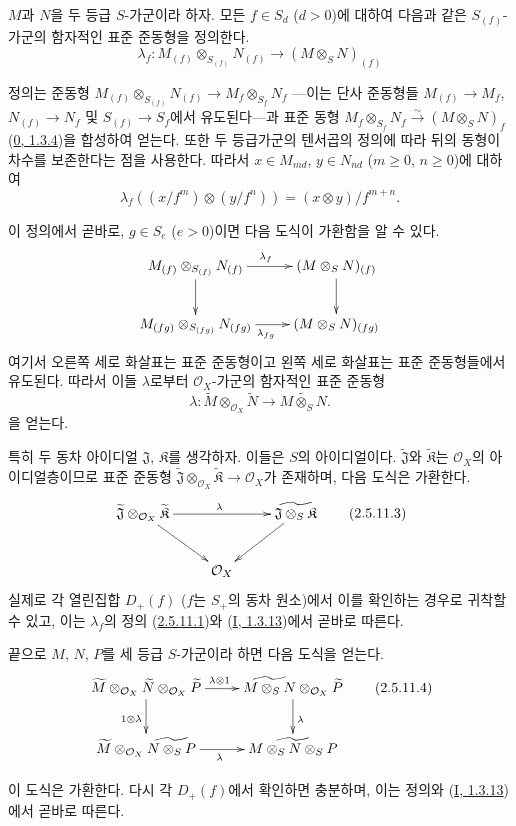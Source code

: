 \begin{env}[2.5.11]
\label{II.2.5.11-ko}
$M$과 $N$을 두 등급 $S$-가군이라 하자. 모든 $f\in S_d$ ($d>0$)에
대하여 다음과 같은 $S_{(f)}$-가군의 함자적인 표준 준동형을 정의한다.
\[
\label{II.2.5.11.1-ko}
  \lambda_f:M_{(f)}\otimes_{S_{(f)}}N_{(f)}
  \longrightarrow(M\otimes_S N)_{(f)}
\tag{2.5.11.1}
\]

정의는 준동형
$M_{(f)}\otimes_{S_{(f)}}N_{(f)}\to M_f\otimes_{S_f}N_f$
---이는 단사 준동형들 $M_{(f)}\to M_f$, $N_{(f)}\to N_f$ 및
$S_{(f)}\to S_f$에서 유도된다---과 표준 동형
$M_f\otimes_{S_f}N_f\xrightarrow{\sim}(M\otimes_S N)_f$
(\hyperref[0.1.3.4-ko]{0, 1.3.4})을 합성하여 얻는다. 또한 두 등급가군의
텐서곱의 정의에 따라 뒤의 동형이 차수를 보존한다는 점을 사용한다. 따라서
$x\in M_{md}$, $y\in N_{nd}$ ($m\geq0$, $n\geq0$)에 대하여
\[
  \lambda_f((x/f^m)\otimes(y/f^n))=(x\otimes y)/f^{m+n}.
\]

이 정의에서 곧바로, $g\in S_e$ ($e>0$)이면 다음 도식이 가환함을 알 수
있다.
\[
  \xymatrix{
    M_{(f)}\otimes_{S_{(f)}}N_{(f)}\ar[r]^{\lambda_f}\ar[d]
    & (M\otimes_S N)_{(f)}\ar[d]\\
    M_{(fg)}\otimes_{S_{(fg)}}N_{(fg)}\ar[r]_{\lambda_{fg}}
    & (M\otimes_S N)_{(fg)}
  }
\]
여기서 오른쪽 세로 화살표는 표준 준동형이고 왼쪽 세로 화살표는 표준
준동형들에서 유도된다. 따라서 이들 $\lambda$로부터
$\mathcal{O}_X$-가군의 함자적인 표준 준동형
\[
\label{II.2.5.11.2-ko}
  \lambda:\widetilde{M}\otimes_{\mathcal{O}_X}\widetilde{N}
  \longrightarrow\widetilde{M\otimes_S N}.
\tag{2.5.11.2}
\]
을 얻는다.

특히 두 동차 아이디얼 $\mathfrak{J}$, $\mathfrak{K}$를 생각하자. 이들은
$S$의 아이디얼이다. $\widetilde{\mathfrak{J}}$와
$\widetilde{\mathfrak{K}}$는 $\mathcal{O}_X$의 아이디얼층이므로 표준 준동형
$\widetilde{\mathfrak{J}}\otimes_{\mathcal{O}_X}
\widetilde{\mathfrak{K}}\to\mathcal{O}_X$가 존재하며, 다음 도식은 가환한다.
\[
\label{II.2.5.11.3-ko}
  \xymatrix{
    \widetilde{\mathfrak{J}}\otimes_{\mathcal{O}_X}
    \widetilde{\mathfrak{K}}\ar[rr]^\lambda\ar[dr]
    && \widetilde{\mathfrak{J}\otimes_S\mathfrak{K}}\ar[dl]\\
    & \mathcal{O}_X &
  }
\tag{2.5.11.3}
\]
실제로 각 열린집합 $D_+(f)$ ($f$는 $S_+$의 동차 원소)에서 이를 확인하는
경우로 귀착할 수 있고, 이는 $\lambda_f$의 정의
(\hyperref[II.2.5.11.1-ko]{2.5.11.1})와
(\hyperref[I.1.3.13-ko]{I, 1.3.13})에서 곧바로 따른다.

끝으로 $M$, $N$, $P$를 세 등급 $S$-가군이라 하면 다음 도식을 얻는다.
\[
\label{II.2.5.11.4-ko}
  \xymatrix{
    \widetilde{M}\otimes_{\mathcal{O}_X}\widetilde{N}
    \otimes_{\mathcal{O}_X}\widetilde{P}
    \ar[r]^{\lambda\otimes1}\ar[d]_{1\otimes\lambda}
    & \widetilde{M\otimes_S N}\otimes_{\mathcal{O}_X}\widetilde{P}
    \ar[d]^\lambda\\
    \widetilde{M}\otimes_{\mathcal{O}_X}\widetilde{N\otimes_S P}
    \ar[r]_\lambda
    & \widetilde{M\otimes_S N\otimes_S P}
  }
\tag{2.5.11.4}
\]

이 도식은 가환한다. 다시 각 $D_+(f)$에서 확인하면 충분하며, 이는 정의와
(\hyperref[I.1.3.13-ko]{I, 1.3.13})에서 곧바로 따른다.
\end{env}


